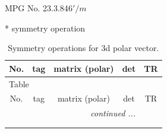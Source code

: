 \documentclass[fleqn,8pt]{jsarticle}
\begin{document}
\setcounter{MaxMatrixCols}{32}

\renewcommand{\tablename}{Table~}
\renewcommand{\figurename}{Figure~}
\begin{center}
\LARGE
MPG No. 23.3.84\quad$6'/m$
\end{center}
* symmetry operation
\renewcommand{\arraystretch}{1.3}
\begin{longtable}{ccccc}
\caption{Symmetry operations for 3d polar vector.}
 \\
 \hline \hline
No. & tag & matrix (polar) & det & TR \\ \hline \endfirsthead

\multicolumn{4}{l}{\tablename\ \thetable{}} \\
 \hline \hline
No. & tag & matrix (polar) & det & TR \\ \hline \endhead

 \hline \hline
\multicolumn{4}{r}{\footnotesize\it continued ...} \\ \endfoot

 \hline \hline
\multicolumn{4}{r}{} \\ \endlastfoot


\end{longtable}
\end{document}
